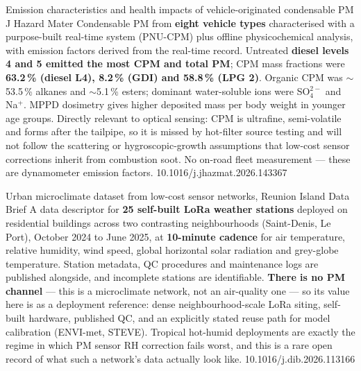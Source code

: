 \documentclass[10pt]{article}
\begin{document}
{Emission characteristics and health impacts of vehicle-originated condensable PM}
{J Hazard Mater}
{Condensable PM from \textbf{eight vehicle types} characterised with a purpose-built
real-time system (PNU-CPM) plus offline physicochemical analysis, with emission factors
derived from the real-time record. Untreated \textbf{diesel levels 4 and 5 emitted the
most CPM and total PM}; CPM mass fractions were \textbf{63.2\,\% (diesel L4), 8.2\,\%
(GDI) and 58.8\,\% (LPG 2)}. Organic CPM was $\sim$53.5\,\% alkanes and $\sim$5.1\,\%
esters; dominant water-soluble ions were SO$_4^{2-}$ and Na$^+$. MPPD dosimetry gives
higher deposited mass per body weight in younger age groups. Directly relevant to optical
sensing: CPM is ultrafine, semi-volatile and forms after the tailpipe, so it is missed by
hot-filter source testing and will not follow the scattering or hygroscopic-growth
assumptions that low-cost sensor corrections inherit from combustion soot. No on-road
fleet measurement --- these are dynamometer emission factors.}
{10.1016/j.jhazmat.2026.143367}

{Urban microclimate dataset from low-cost sensor networks, Reunion Island}
{Data Brief}
{A data descriptor for \textbf{25 self-built LoRa weather stations} deployed on
residential buildings across two contrasting neighbourhoods (Saint-Denis, Le Port),
October 2024 to June 2025, at \textbf{10-minute cadence} for air temperature, relative
humidity, wind speed, global horizontal solar radiation and grey-globe temperature.
Station metadata, QC procedures and maintenance logs are published alongside, and
incomplete stations are identifiable. \textbf{There is no PM channel} --- this is a
microclimate network, not an air-quality one --- so its value here is as a deployment
reference: dense neighbourhood-scale LoRa siting, self-built hardware, published QC, and
an explicitly stated reuse path for model calibration (ENVI-met, STEVE). Tropical
hot-humid deployments are exactly the regime in which PM sensor RH correction fails
worst, and this is a rare open record of what such a network's data actually look like.}
{10.1016/j.dib.2026.113166}
\end{document}
